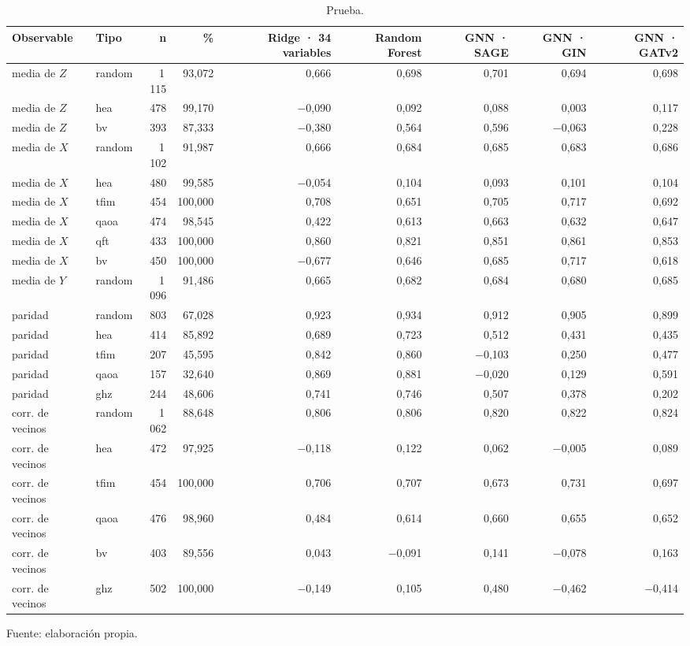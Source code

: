 \begin{table}[htbp]
    \centering
    {\footnotesize
    \begin{tabular}{@{}llrrrrrrr@{}}
        \toprule
        \textbf{Observable} & \textbf{Tipo} & \textbf{n} & \textbf{\%} & \textbf{Ridge · 34 variables} & \textbf{Random Forest} & \textbf{GNN · SAGE} & \textbf{GNN · GIN} & \textbf{GNN · GATv2} \\
        \midrule
        media de $Z$ & random & 1\,115 & 93,072 & 0,666 & 0,698 & 0,701 & 0,694 & 0,698 \\
        media de $Z$ & hea & 478 & 99,170 & $-$0,090 & 0,092 & 0,088 & 0,003 & 0,117 \\
        media de $Z$ & bv & 393 & 87,333 & $-$0,380 & 0,564 & 0,596 & $-$0,063 & 0,228 \\
        media de $X$ & random & 1\,102 & 91,987 & 0,666 & 0,684 & 0,685 & 0,683 & 0,686 \\
        media de $X$ & hea & 480 & 99,585 & $-$0,054 & 0,104 & 0,093 & 0,101 & 0,104 \\
        media de $X$ & tfim & 454 & 100,000 & 0,708 & 0,651 & 0,705 & 0,717 & 0,692 \\
        media de $X$ & qaoa & 474 & 98,545 & 0,422 & 0,613 & 0,663 & 0,632 & 0,647 \\
        media de $X$ & qft & 433 & 100,000 & 0,860 & 0,821 & 0,851 & 0,861 & 0,853 \\
        media de $X$ & bv & 450 & 100,000 & $-$0,677 & 0,646 & 0,685 & 0,717 & 0,618 \\
        media de $Y$ & random & 1\,096 & 91,486 & 0,665 & 0,682 & 0,684 & 0,680 & 0,685 \\
        paridad & random & 803 & 67,028 & 0,923 & 0,934 & 0,912 & 0,905 & 0,899 \\
        paridad & hea & 414 & 85,892 & 0,689 & 0,723 & 0,512 & 0,431 & 0,435 \\
        paridad & tfim & 207 & 45,595 & 0,842 & 0,860 & $-$0,103 & 0,250 & 0,477 \\
        paridad & qaoa & 157 & 32,640 & 0,869 & 0,881 & $-$0,020 & 0,129 & 0,591 \\
        paridad & ghz & 244 & 48,606 & 0,741 & 0,746 & 0,507 & 0,378 & 0,202 \\
        corr. de vecinos & random & 1\,062 & 88,648 & 0,806 & 0,806 & 0,820 & 0,822 & 0,824 \\
        corr. de vecinos & hea & 472 & 97,925 & $-$0,118 & 0,122 & 0,062 & $-$0,005 & 0,089 \\
        corr. de vecinos & tfim & 454 & 100,000 & 0,706 & 0,707 & 0,673 & 0,731 & 0,697 \\
        corr. de vecinos & qaoa & 476 & 98,960 & 0,484 & 0,614 & 0,660 & 0,655 & 0,652 \\
        corr. de vecinos & bv & 403 & 89,556 & 0,043 & $-$0,091 & 0,141 & $-$0,078 & 0,163 \\
        corr. de vecinos & ghz & 502 & 100,000 & $-$0,149 & 0,105 & 0,480 & $-$0,462 & $-$0,414 \\
        \bottomrule
    \end{tabular}}

    \caption{Prueba.}
    \label{tab:e_tipo_spearman_f}

    {\footnotesize Fuente: elaboración propia.}
\end{table}

